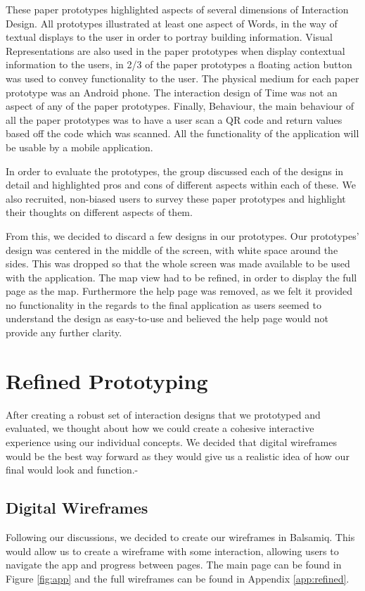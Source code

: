 \documentclass[a4,10pt,twocolumn]{article}
\begin{document}
These paper prototypes highlighted aspects of several dimensions of Interaction Design. All prototypes illustrated at least one aspect of Words, in the way of textual displays to the user in order to portray building information. Visual Representations are also used in the paper prototypes when display contextual information to the users, in 2/3 of the paper prototypes a floating action button was used to convey functionality to the user. The physical medium for each paper prototype was an Android phone. The interaction design of Time was not an aspect of any of the paper prototypes. Finally, Behaviour, the main behaviour of all the paper prototypes was to have a user scan a QR code and return values based off the code which was scanned. All the functionality of the application will be usable by a mobile application.

In order to evaluate the prototypes, the group discussed each of the designs in detail and highlighted pros and cons of different aspects within each of these. We also recruited, non-biased users to survey these paper prototypes and highlight their thoughts on different aspects of them.

From this, we decided to discard a few designs in our prototypes. Our prototypes' design was centered in the middle of the screen, with white space around the sides. This was dropped so that the whole screen was made available to be used with the application. The map view had to be refined, in order to display the full page as the map. Furthermore the help page was removed, as we felt it provided no functionality in the regards to the final application as users seemed to understand the design as easy-to-use and believed the help page would not provide any further clarity.

\section{Refined Prototyping}
After creating a robust set of interaction designs that we prototyped and evaluated, we thought about how we could create a cohesive interactive experience using our individual concepts. We decided that digital wireframes would be the best way forward as they would give us a realistic idea of how our final would look and function.-

\subsection{Digital Wireframes}
Following our discussions, we decided to create our wireframes in Balsamiq. This would allow us to create a wireframe with some interaction, allowing users to navigate the app and progress between pages. The main page can be found in Figure \ref{fig:app} and the full wireframes can be found in Appendix \ref{app:refined}.
\end{document}
